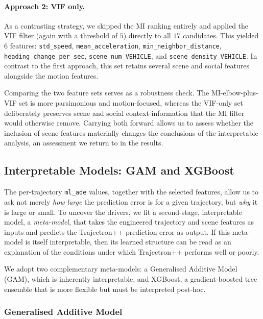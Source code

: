 \documentclass[12pt]{article}
\begin{document}
\paragraph{Approach 2: VIF only.} As a contrasting strategy, we skipped the MI ranking entirely and applied the VIF filter (again with a threshold of $5$) directly to all $17$ candidates. This yielded $6$ features: \texttt{std\_speed}, \texttt{mean\_acceleration}, \texttt{min\_neighbor\_distance}, \texttt{heading\_change\_per\_sec}, \texttt{scene\_num\_VEHICLE}, and \texttt{scene\_density\_VEHICLE}. In contrast to the first approach, this set retains several scene and social features alongside the motion features.

Comparing the two feature sets serves as a robustness check. The MI-elbow-plus-VIF set is more parsimonious and motion-focused, whereas the VIF-only set deliberately preserves scene and social context information that the MI filter would otherwise remove. Carrying both forward allows us to assess whether the inclusion of scene features materially changes the conclusions of the interpretable analysis, an assessment we return to in the results.

\subsection{Interpretable Models: GAM and XGBoost}
\label{sec:interpretable_models}

The per-trajectory \texttt{ml\_ade} values, together with the selected features, allow us to ask not merely \emph{how large} the prediction error is for a given trajectory, but \emph{why} it is large or small. To uncover the drivers, we fit a second-stage, interpretable model, a \emph{meta-model}, that takes the engineered trajectory and scene features as inputs and predicts the Trajectron++ prediction error as output. If this meta-model is itself interpretable, then its learned structure can be read as an explanation of the conditions under which Trajectron++ performs well or poorly.

We adopt two complementary meta-models: a Generalised Additive Model (GAM), which is inherently interpretable, and XGBoost, a gradient-boosted tree ensemble that is more flexible but must be interpreted post-hoc.

\subsubsection{Generalised Additive Model}
\end{document}
